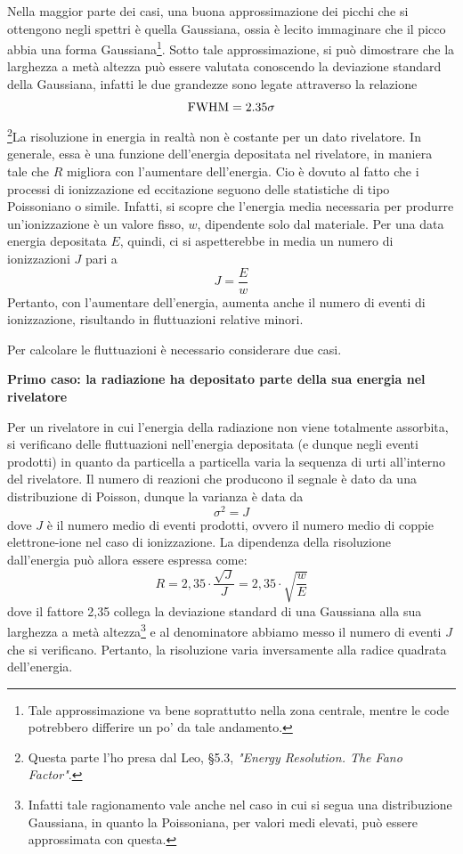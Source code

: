 Nella maggior parte dei casi, una buona approssimazione dei picchi che si ottengono negli spettri è quella Gaussiana, ossia è lecito immaginare che il picco abbia una forma Gaussiana\footnote{Tale approssimazione va bene soprattutto nella zona centrale, mentre le code potrebbero differire un po' da tale andamento.}. Sotto tale approssimazione, si può dimostrare che la larghezza a metà altezza può essere valutata conoscendo la deviazione standard della Gaussiana, infatti le due grandezze sono legate attraverso la relazione
\begin{equation*}
   \rm FWHM=2.35\sigma
\end{equation*}
\footnote{Questa parte l'ho presa dal Leo, \S5.3, \textit{"Energy Resolution. The Fano Factor"}.}La risoluzione in energia in realtà non è costante per un dato rivelatore. In generale, essa è una funzione dell'energia depositata nel rivelatore, in maniera tale che $R$ migliora con l'aumentare dell'energia. Cio è dovuto al fatto che i processi di ionizzazione ed eccitazione seguono delle statistiche di tipo Poissoniano o simile. Infatti, si scopre che l'energia media necessaria per produrre un'ionizzazione è un valore fisso, $w$, dipendente solo dal materiale. Per una data energia depositata $E$, quindi, ci si aspetterebbe in media un numero di ionizzazioni $J$ pari a
\begin{equation*}
   J=\frac{E}{w} 
\end{equation*}
Pertanto, con l'aumentare dell'energia, aumenta anche il numero di eventi di ionizzazione, risultando in fluttuazioni relative minori.

Per calcolare le fluttuazioni è necessario considerare due casi.

\newpage

\textbf{Primo caso: la radiazione ha depositato parte della sua energia nel rivelatore}

Per un rivelatore in cui l'energia della radiazione non viene totalmente assorbita, si verificano delle fluttuazioni nell'energia depositata (e dunque negli eventi prodotti) in quanto da particella a particella varia la sequenza di urti all'interno del rivelatore. Il numero di reazioni che producono il segnale è dato da una distribuzione di Poisson, dunque la varianza è data da
\begin{equation*}
   \sigma^2 = J
\end{equation*}
dove $J$ è il numero medio di eventi prodotti, ovvero il numero medio di coppie elettrone-ione nel caso di ionizzazione. La dipendenza della risoluzione dall'energia può allora essere espressa come:
\begin{equation*}
   R
   =2,35 \cdot \frac{\sqrt{J}}{J}
   =2,35 \cdot \sqrt{\frac{w}{E}}
\end{equation*}
dove il fattore 2,35 collega la deviazione standard di una Gaussiana alla sua larghezza a metà altezza\footnote{Infatti tale ragionamento vale anche nel caso in cui si segua una distribuzione Gaussiana, in quanto la Poissoniana, per valori medi elevati, può essere approssimata con questa.} e al denominatore abbiamo messo il numero di eventi $J$ che si verificano. Pertanto, la risoluzione varia inversamente alla radice quadrata dell'energia.

